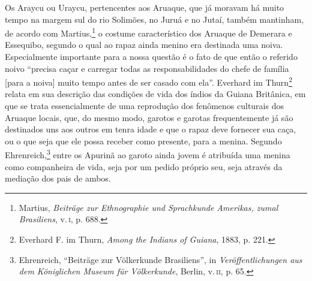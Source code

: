 Os Araycu ou Uraycu, pertencentes aos Aruaque, que já moravam há muito
tempo na margem sul do rio Solimões, no Juruá e no Jutaí, também
mantinham, de acordo com Martius,\footnote{Martius, \emph{Beiträge zur
  Ethnographie und Sprachkunde Amerikas, zumal Brasiliens}, v.\,\textsc{i}, p.
  688.} o costume característico dos Aruaque de Demerara e Essequibo,
segundo o qual ao rapaz ainda menino era destinada uma noiva.
Especialmente importante para a nossa questão é o fato de que então o
referido noivo ``precisa caçar e carregar todas as responsabilidades do
chefe de família {[}para a noiva{]} muito tempo antes de ser casado com
ela''. Everhard im Thurn\footnote{Everhard F. im Thurn, \emph{Among the
  Indians of Guiana}, 1883, p. 221.} relata em sua descrição das
condições de vida dos índios da Guiana Britânica, em que se trata
essencialmente de uma reprodução dos fenômenos culturais dos Aruaque
locais, que, do mesmo modo, garotos e garotas frequentemente já são
destinados uns aos outros em tenra idade e que o rapaz deve fornecer sua
caça, ou o que seja que ele possa receber como presente, para a menina.
Segundo Ehrenreich,\footnote{Ehrenreich, ``Beiträge zur Völkerkunde
  Brasiliens'', in \emph{Veröffentlichungen aus dem Königlichen Museum
  für Völkerkunde}, Berlin, v.\,\textsc{ii}, p. 65.} entre os Apurinã ao garoto
ainda jovem é atribuída uma menina como companheira de vida, seja por um
pedido próprio seu, seja através da mediação dos pais de ambos.


